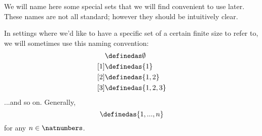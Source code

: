 {



We will name here some special sets that we will find convenient to use later. These names are not all standard; however they should be intuitively clear.

In settings where we'd like to have a specific set of a certain finite size to refer to, we will sometimes use this naming convention:
\begin{align*}
[0]
  & \definedas \emptyset \\
  [1] & \definedas \{ 1\} \\
  [2] & \definedas \{ 1, 2\} \\
  [3] & \definedas \{ 1, 2, 3\}
\end{align*}
...and so on. Generally,
\begin{equation}
[n]
  \definedas \{ 1, ..., n\}
\end{equation}
for any $n \in \natnumbers$.}



\clearpage
